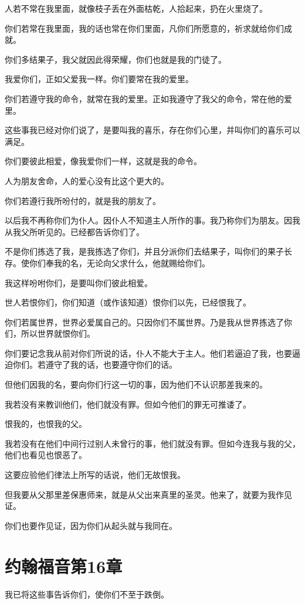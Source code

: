 \documentclass[12pt,oneside]{book}
\begin{document}
人若不常在我里面，就像枝子丢在外面枯乾，人拾起来，扔在火里烧了。

你们若常在我里面，我的话也常在你们里面，凡你们所愿意的，祈求就给你们成就。

你们多结果子，我父就因此得荣耀，你们也就是我的门徒了。

我爱你们，正如父爱我一样。你们要常在我的爱里。

你们若遵守我的命令，就常在我的爱里。正如我遵守了我父的命令，常在他的爱里。

这些事我已经对你们说了，是要叫我的喜乐，存在你们心里，并叫你们的喜乐可以满足。

你们要彼此相爱，像我爱你们一样，这就是我的命令。

人为朋友舍命，人的爱心没有比这个更大的。

你们若遵行我所吩付的，就是我的朋友了。

以后我不再称你们为仆人。因仆人不知道主人所作的事。我乃称你们为朋友。因我从我父所听见的。已经都告诉你们了。

不是你们拣选了我，是我拣选了你们，并且分派你们去结果子，叫你们的果子长存。使你们奉我的名，无论向父求什么，他就赐给你们。

我这样吩咐你们，是要叫你们彼此相爱。

世人若恨你们，你们知道（或作该知道）恨你们以先，已经恨我了。

你们若属世界，世界必爱属自己的。只因你们不属世界。乃是我从世界拣选了你们，所以世界就恨你们。

你们要记念我从前对你们所说的话，仆人不能大于主人。他们若逼迫了我，也要逼迫你们。若遵守了我的话，也要遵守你们的话。

但他们因我的名，要向你们行这一切的事，因为他们不认识那差我来的。

我若没有来教训他们，他们就没有罪。但如今他们的罪无可推诿了。

恨我的，也恨我的父。

我若没有在他们中间行过别人未曾行的事，他们就没有罪。但如今连我与我的父，他们也看见也恨恶了。

这要应验他们律法上所写的话说，他们无故恨我。

但我要从父那里差保惠师来，就是从父出来真里的圣灵。他来了，就要为我作见证。

你们也要作见证，因为你们从起头就与我同在。

\chapter{约翰福音第16章}
我已将这些事告诉你们，使你们不至于跌倒。
\end{document}
